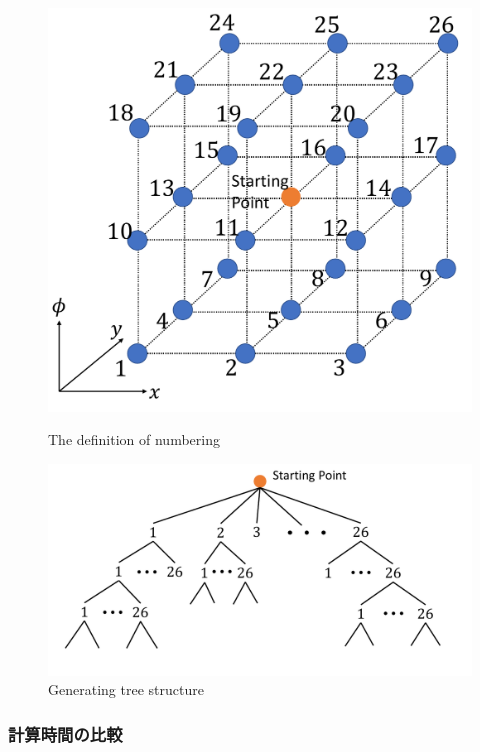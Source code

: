 \documentclass[a4paper,twoside,12pt,papersize, dvipdfmx]{iirthesis}
\begin{document}
\begin{figure}[t]
\centering
\begin{minipage}{0.4\hsize}
\includegraphics[width=0.9\hsize]{fig/3-new-planner/directiondef.pdf}
\caption{The definition of numbering}\label{fig::planner::numbering}
\end{minipage}\hfill
\begin{minipage}{0.59\hsize}
\includegraphics[width=\hsize]{fig/3-new-planner/treegraph.pdf}
\caption{Generating tree structure}\label{fig::planner::treegraph}
\end{minipage}
\end{figure}

\subsubsection{計算時間の比較}
\end{document}

